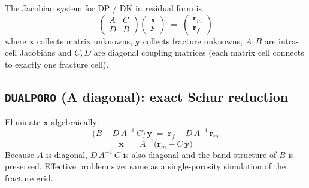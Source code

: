 \documentclass[11pt,a4paper]{article}
\newcommand{\kw}[1]{\texttt{#1}}
\begin{document}
The Jacobian system for DP / DK in residual form is
\begin{equation}
\begin{pmatrix} A & C \\ D & B \end{pmatrix}
\begin{pmatrix} \mathbf{x} \\ \mathbf{y} \end{pmatrix}
\;=\;
\begin{pmatrix} \mathbf{r}_m \\ \mathbf{r}_f \end{pmatrix}
\label{eq:jac-block}
\end{equation}
where $\mathbf{x}$ collects matrix unknowns, $\mathbf{y}$ collects fracture unknowns; $A,B$ are intra-cell Jacobians and $C,D$ are diagonal coupling matrices (each matrix cell connects to exactly one fracture cell).

\subsection*{\kw{DUALPORO} (A diagonal): exact Schur reduction}
Eliminate $\mathbf{x}$ algebraically:
\begin{equation}
\bigl(B - D\,A^{-1}\,C\bigr)\,\mathbf{y} \;=\; \mathbf{r}_f - D\,A^{-1}\,\mathbf{r}_m
\label{eq:schur}
\tag{TD 2.82}
\end{equation}
\begin{equation}
\mathbf{x} \;=\; A^{-1}\bigl(\mathbf{r}_m - C\,\mathbf{y}\bigr)
\label{eq:backsub}
\tag{TD 2.83}
\end{equation}
Because $A$ is diagonal, $D\,A^{-1}\,C$ is also diagonal and the band structure of $B$ is preserved.
Effective problem size: same as a single-porosity simulation of the fracture grid.
\end{document}
